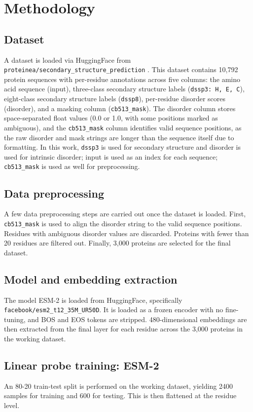 \documentclass[12pt, letterpaper]{article}
\begin{document}
\section{Methodology}

\subsection{Dataset}
A dataset is loaded via HuggingFace from \texttt{proteinea/secondary\_structure\_prediction} \citet{proteinea_ssp}. This dataset contains 10,792 protein sequences with per-residue annotations across five columns: the amino acid sequence (input), three-class secondary structure labels (\texttt{dssp3: H, E, C}), eight-class secondary structure labels (\texttt{dssp8}), per-residue disorder scores (disorder), and a masking column (\texttt{cb513\_mask}). The disorder column stores space-separated float values (0.0 or 1.0, with some positions marked as ambiguous), and the \texttt{cb513\_mask} column identifies valid sequence positions, as the raw disorder and mask strings are longer than the sequence itself due to formatting. In this work, \texttt{dssp3} is used for secondary structure and disorder is used for intrinsic disorder; input is used as an index for each sequence; \texttt{cb513\_mask} is used as well for preprocessing.

\subsection{Data preprocessing}
A few data preprocessing steps are carried out once the dataset is loaded. First, \texttt{cb513\_mask} is used to align the disorder string to the valid sequence positions. Residues with ambiguous disorder values are discarded. Proteins with fewer than 20 residues are filtered out. Finally, 3,000 proteins are selected for the final dataset.

\subsection{Model and embedding extraction}
The model ESM-2 is loaded from HuggingFace, specifically \texttt{facebook/esm2\_t12\_35M\_UR50D}. It is loaded as a frozen encoder with no fine-tuning, and BOS and EOS tokens are stripped. 480-dimensional embeddings are then extracted from the final layer for each residue across the 3,000 proteins in the working dataset.

\subsection{Linear probe training: ESM-2}
An 80-20 train-test split is performed on the working dataset, yielding 2400 samples for training and 600 for testing. This is then flattened at the residue level. 
\end{document}
